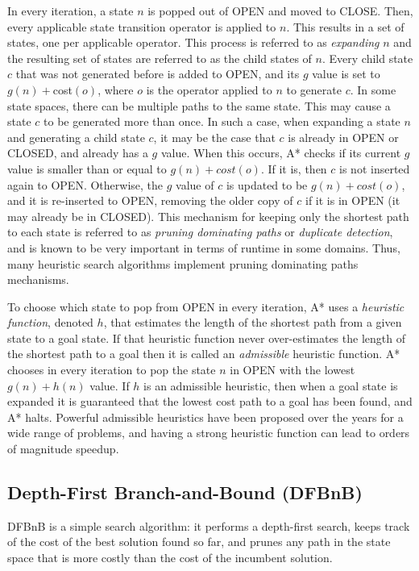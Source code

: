\documentclass[letterpaper]{article} %
\begin{document}
In every iteration, a state $n$ is popped out of OPEN and moved to CLOSE. Then, every applicable state transition operator is applied to $n$. This results in a set of states, one per applicable operator. This process is referred to as \emph{expanding} $n$ and the resulting set of states are referred to as the child states of $n$. 
Every child state $c$ that was not generated before is added to OPEN, and its $g$ value is set to  $g(n)+$cost$(o)$, where $o$ is the operator applied to $n$ to generate $c$. 
In some state spaces, there can be multiple paths to the same state. 
This may cause a state $c$ to be generated more than once. 
In such a case, when expanding a state $n$ and generating a child state $c$, it may be the case that $c$ is already in OPEN or CLOSED, and already has a $g$ value.
When this occurs, A* checks if its current $g$ value is smaller than or equal to $g(n)+cost(o)$. If it is, then $c$ is not inserted again to OPEN. Otherwise, the $g$ value of $c$ is updated to be 
$g(n)+cost(o)$, and it is re-inserted to OPEN, removing the older copy of $c$ if it is in OPEN (it may already be in CLOSED). 
This mechanism for keeping only the shortest path to each state is referred to as \emph{pruning dominating paths} or \emph{duplicate detection}, and is known to be very important in terms of runtime in some domains. Thus, many heuristic search algorithms implement pruning dominating paths mechanisms.  


To choose which state to pop from OPEN in every iteration, A* uses a \emph{heuristic function}, denoted $h$, that estimates the length of the shortest path from a given state to a goal state. If that heuristic function never over-estimates the length of the shortest path to a goal then it is called an \emph{admissible} heuristic function. A* chooses in every iteration to pop the state $n$ in OPEN with the lowest $g(n)+h(n)$ value. If $h$ is an admissible heuristic, then when a goal state is expanded it is guaranteed that the lowest cost path to a goal has been found, and A* halts. Powerful admissible heuristics have been proposed over the years for a wide range of problems, and  having a strong heuristic function can lead to orders of magnitude speedup. 


\subsection{Depth-First Branch-and-Bound (DFBnB)}
DFBnB is a simple search algorithm: it performs a depth-first search, keeps track of the cost of the best solution found so far, 
and prunes any path in the state space that is more costly than the cost of the incumbent solution. 
\end{document}
